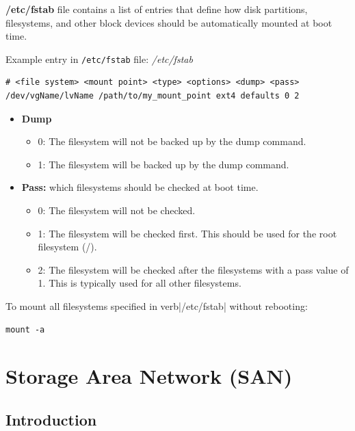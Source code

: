 \documentclass{article}
\newenvironment{codetemplate}[1][]{%
  \mybasecolorbox[#1]
  \itshape
}{%
  \endmybasecolorbox
}
\begin{document}
\textbf{/etc/fstab} file contains a list of entries that define how disk partitions, filesystems, and other block devices should be automatically mounted at boot time.

Example entry in \verb|/etc/fstab| file:
\begin{codetemplate}{/etc/fstab}
\begin{verbatim}
# <file system> <mount point> <type> <options> <dump> <pass>
/dev/vgName/lvName /path/to/my_mount_point ext4 defaults 0 2
\end{verbatim}
\end{codetemplate}

\begin{itemize}
    \item \textbf{Dump}
    \begin{itemize}
        \item 0: The filesystem will not be backed up by the dump command.
        \item 1: The filesystem will be backed up by the dump command.
    \end{itemize}
    \item \textbf{Pass:} which filesystems should be checked at boot time.
    \begin{itemize}
        \item 0: The filesystem will not be checked.
        \item 1: The filesystem will be checked first. This should be used for the root filesystem (/).
        \item 2: The filesystem will be checked after the filesystems with a pass value of 1. This is typically used for all other filesystems.
    \end{itemize}
\end{itemize}

To mount all filesystems specified in verb|/etc/fstab| without rebooting:
\begin{codetemplate}
\begin{verbatim}
mount -a
\end{verbatim}
\end{codetemplate}

\newpage
\section{Storage Area Network (SAN)}

\subsection{Introduction}
\end{document}
